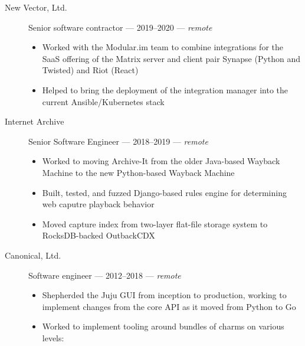 \documentclass[letterpaper]{memoir}
\begin{document}
\begin{description}
    \item[New Vector, Ltd.]
    Senior software contractor --- 2019--2020 --- \emph{remote}

    \begin{itemize}
        \tightlist
        \item
        Worked with the Modular.im team to combine integrations for the SaaS offering of the Matrix server and client pair Synapse (Python and Twisted) and Riot (React)
        \item
        Helped to bring the deployment of the integration manager into the current Ansible/Kubernetes stack
    \end{itemize}
    \item[Internet Archive]
    Senior Software Engineer --- 2018--2019 --- \emph{remote}

    \begin{itemize}
        \tightlist
        \item
        Worked to moving Archive-It from the older Java-based Wayback Machine to the new Python-based Wayback Machine
        \item
        Built, tested, and fuzzed Django-based rules engine for determining web caputre playback behavior
        \item
        Moved capture index from two-layer flat-file storage system to RocksDB-backed OutbackCDX
    \end{itemize}
    \item[Canonical, Ltd.]
    Software engineer --- 2012--2018 --- \emph{remote}

    \begin{itemize}
        \tightlist
        \item
        Shepherded the Juju GUI from inception to production, working to implement changes from the core API as it moved from Python to Go
        \item
        Worked to implement tooling around bundles of charms on various levels:


\end{itemize}
\end{description}
\end{document}
